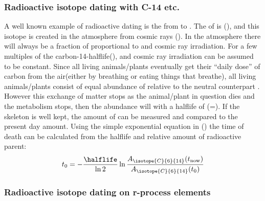 \subsubsection{Radioactive isotope dating with C-14 etc.}
A well known example of radioactive dating is the \betadecay from  to . The \halflife of  is (), and this isotope is created in the atmosphere from cosmic rays (). In the atmosphere there will always be a fraction of   proportional to  and cosmic ray irradiation.
For a few multiples of the carbon-14-halflife(),  and cosmic ray irradiation can be assumed to be constant. Since all living animals/plants eventually get their ``daily dose'' of carbon from the air(either by breathing or eating things that breathe), all living animals/plants consist of equal abundance of  relative to the neutral counterpart . However this exchange of matter stops as the animal/plant in question dies and the metabolism stops, then the  abundance will \betadecay with a halflife of (\halflife=). If the skeleton is well kept, the amount of  can be measured and compared to the present day amount. Using the simple exponential equation in () the time of death can be calculated from the halflife and relative amount of radioactive parent:
$$ t_0 = -\frac{\halflife}{\ln 2} \ln \frac{A_\isotope{C}{6}{14}(t_{\text{now}})}{A_\isotope{C}{6}{14}(t_0)}$$
\subsubsection{Radioactive isotope dating on r-process elements}

